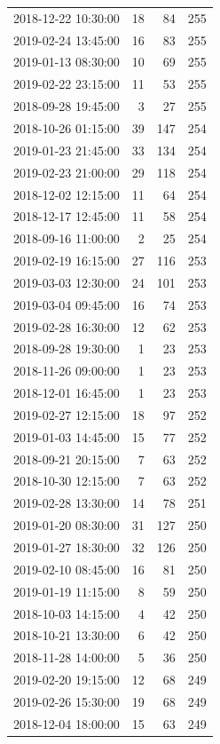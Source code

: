 \begin{tabular}{lrrr}
2018-12-22 10:30:00 & 18 & 84 & 255 \\
2019-02-24 13:45:00 & 16 & 83 & 255 \\
2019-01-13 08:30:00 & 10 & 69 & 255 \\
2019-02-22 23:15:00 & 11 & 53 & 255 \\
2018-09-28 19:45:00 & 3 & 27 & 255 \\
2018-10-26 01:15:00 & 39 & 147 & 254 \\
2019-01-23 21:45:00 & 33 & 134 & 254 \\
2019-02-23 21:00:00 & 29 & 118 & 254 \\
2018-12-02 12:15:00 & 11 & 64 & 254 \\
2018-12-17 12:45:00 & 11 & 58 & 254 \\
2018-09-16 11:00:00 & 2 & 25 & 254 \\
2019-02-19 16:15:00 & 27 & 116 & 253 \\
2019-03-03 12:30:00 & 24 & 101 & 253 \\
2019-03-04 09:45:00 & 16 & 74 & 253 \\
2019-02-28 16:30:00 & 12 & 62 & 253 \\
2018-09-28 19:30:00 & 1 & 23 & 253 \\
2018-11-26 09:00:00 & 1 & 23 & 253 \\
2018-12-01 16:45:00 & 1 & 23 & 253 \\
2019-02-27 12:15:00 & 18 & 97 & 252 \\
2019-01-03 14:45:00 & 15 & 77 & 252 \\
2018-09-21 20:15:00 & 7 & 63 & 252 \\
2018-10-30 12:15:00 & 7 & 63 & 252 \\
2019-02-28 13:30:00 & 14 & 78 & 251 \\
2019-01-20 08:30:00 & 31 & 127 & 250 \\
2019-01-27 18:30:00 & 32 & 126 & 250 \\
2019-02-10 08:45:00 & 16 & 81 & 250 \\
2019-01-19 11:15:00 & 8 & 59 & 250 \\
2018-10-03 14:15:00 & 4 & 42 & 250 \\
2018-10-21 13:30:00 & 6 & 42 & 250 \\
2018-11-28 14:00:00 & 5 & 36 & 250 \\
2019-02-20 19:15:00 & 12 & 68 & 249 \\
2019-02-26 15:30:00 & 19 & 68 & 249 \\
2018-12-04 18:00:00 & 15 & 63 & 249 \\

\end{tabular}
